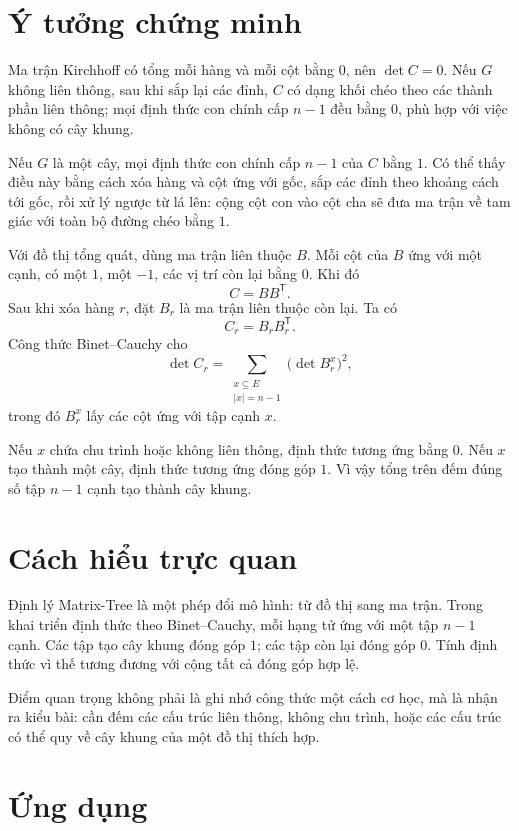\documentclass[11pt]{article}
\begin{document}
\section{Ý tưởng chứng minh}

Ma trận Kirchhoff có tổng mỗi hàng và mỗi cột bằng \(0\), nên \(\det C=0\).
Nếu \(G\) không liên thông, sau khi sắp lại các đỉnh, \(C\) có dạng khối chéo
theo các thành phần liên thông; mọi định thức con chính cấp \(n-1\) đều bằng
\(0\), phù hợp với việc không có cây khung.

Nếu \(G\) là một cây, mọi định thức con chính cấp \(n-1\) của \(C\) bằng
\(1\). Có thể thấy điều này bằng cách xóa hàng và cột ứng với gốc, sắp các
đỉnh theo khoảng cách tới gốc, rồi xử lý ngược từ lá lên: cộng cột con vào
cột cha sẽ đưa ma trận về tam giác với toàn bộ đường chéo bằng \(1\).

Với đồ thị tổng quát, dùng ma trận liên thuộc \(B\). Mỗi cột của \(B\) ứng
với một cạnh, có một \(1\), một \(-1\), các vị trí còn lại bằng \(0\). Khi đó
\[
  C=BB^{\mathsf T}.
\]
Sau khi xóa hàng \(r\), đặt \(B_r\) là ma trận liên thuộc còn lại. Ta có
\[
  C_r=B_rB_r^{\mathsf T}.
\]
Công thức Binet--Cauchy cho
\[
  \det C_r=
  \sum_{\substack{x\subseteq E\\ |x|=n-1}}
  \bigl(\det B_r^x\bigr)^2,
\]
trong đó \(B_r^x\) lấy các cột ứng với tập cạnh \(x\).

Nếu \(x\) chứa chu trình hoặc không liên thông, định thức tương ứng bằng
\(0\). Nếu \(x\) tạo thành một cây, định thức tương ứng đóng góp \(1\). Vì
vậy tổng trên đếm đúng số tập \(n-1\) cạnh tạo thành cây khung.

\section{Cách hiểu trực quan}

Định lý Matrix-Tree là một phép đổi mô hình: từ đồ thị sang ma trận. Trong
khai triển định thức theo Binet--Cauchy, mỗi hạng tử ứng với một tập
\(n-1\) cạnh. Các tập tạo cây khung đóng góp \(1\); các tập còn lại đóng góp
\(0\). Tính định thức vì thế tương đương với cộng tất cả đóng góp hợp lệ.

Điểm quan trọng không phải là ghi nhớ công thức một cách cơ học, mà là nhận
ra kiểu bài: cần đếm các cấu trúc liên thông, không chu trình, hoặc các cấu
trúc có thể quy về cây khung của một đồ thị thích hợp.

\section{Ứng dụng}
\end{document}
